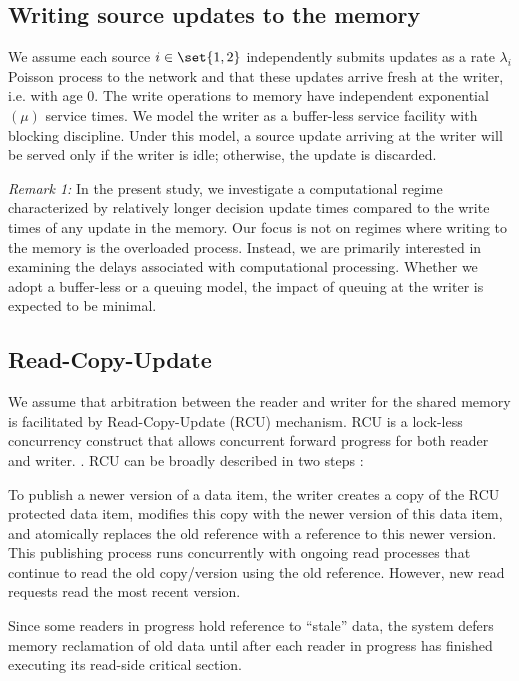 \documentclass[conference, 10pt]{IEEEtran}
\newcommand{\lam}{\lambda}
\newcommand{\RY}[1]{\quad {\color{red} #1} \quad}
\begin{document}
\subsection{Writing source updates to the memory}
We assume each source $i \in \set{1,2}$ independently submits updates as a rate $\lam_i$ Poisson process to the network and 
that these updates arrive fresh at the writer, i.e. with age $0$. 
The write operations to memory have independent exponential $(\mu)$ service times.
We model the writer as a buffer-less service facility with blocking discipline.  Under this model, a source update arriving at the writer will be served only if the writer is idle; otherwise, the update is discarded.

\textit{Remark 1: } In the present study, we investigate a computational regime characterized by relatively longer decision update times compared to the write times of any update in the memory. Our focus is not on regimes where writing to the memory is the overloaded process. Instead, we are primarily interested in examining the delays associated with computational processing. Whether we adopt a buffer-less or a queuing model, the impact of queuing at the writer is expected to be minimal.


\subsection{Read-Copy-Update}
We assume that arbitration between the reader and writer for the shared memory is facilitated by Read-Copy-Update (RCU) mechanism. RCU is a lock-less concurrency construct that allows concurrent forward progress for both reader and writer. \cite{MckenneyRCU2001}. RCU can be broadly described in two steps \cite{kernelRCU}: 
\begin{enumerate*}
     \item To publish a newer version of a data item,
     the writer creates a copy of the RCU protected data item, modifies this copy with the newer version of this data item, and atomically replaces the old reference with a reference to this newer version.
     This publishing process runs concurrently 
     with ongoing read processes that continue to read the old copy/version using the old reference. However, new read requests 
     read the most recent 
     version. 
    \item Since some readers in progress hold reference to ``stale'' data, the system defers memory reclamation of old data until after each reader in progress has finished executing its read-side critical section. 
\end{enumerate*}
\end{document}
